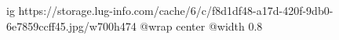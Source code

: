  
 
 
 
 

\ifcmt
  ig https://storage.lug-info.com/cache/6/c/f8d1df48-a17d-420f-9db0-6e7859ccff45.jpg/w700h474%
  @wrap center
  @width 0.8
\fi
